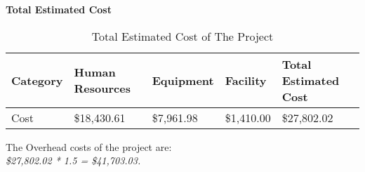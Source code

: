 \begin{table}[H]
    \centering
    \textbf{Total Estimated Cost}
    \begin{tabular}{||m{}|m{}|m{}|m{}|m{}||}
        \hline 
        \rowcolor{cyan}
        Category & Human Resources & Equipment & Facility & Total Estimated Cost\\
        \hline
        \rowcolor{teal}
        Cost & \$18,430.61 & \$7,961.98 & \$1,410.00 & \$27,802.02\\
        \hline
    \end{tabular}
    \caption {Total Estimated Cost of The Project}
       \label{table:6}
\end{table}
The Overhead costs of the project are:\\
\textit{\$27,802.02 * 1.5 = \$41,703.03.}